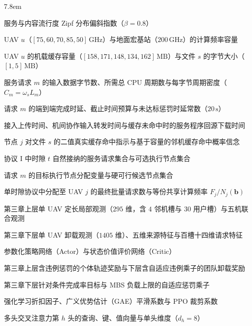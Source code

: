 \begin{notation}
\begin{notationlist}{7.8em}
    \item[$\beta$] 服务与内容流行度 Zipf 分布偏斜指数（$\beta=0.8$）
    \item[$F_u,\ F_{\mathrm{M}}$] UAV $u$（$[75,60,70,85,50]\,\mathrm{GHz}$）与地面宏基站（$200\,\mathrm{GHz}$）的计算频率容量
    \item[$S_u^{\mathrm{cache}},\ B_s$] UAV $u$ 的机载缓存容量（$[158,171,148,134,162]\,\mathrm{MB}$）与文件 $s$ 的字节大小（$[1,5]\,\mathrm{MB}$）
    \item[$L_m,\ C_m,\ \omega_s$] 服务请求 $m$ 的输入数据字节数、所需总 CPU 周期数与每字节周期密度（$C_m=\omega_s L_m$）
    \item[$T_m,\ D_m,\ T^{\mathrm{pen}}$] 请求 $m$ 的端到端完成时延、截止时间预算与未达标惩罚时延常数（$20\,\mathrm{s}$）
    \item[$U_m,\ I_{m,u,v},\ V_{j,s}$] 接入上传时间、机间协作输入转发时间与缓存未命中时的服务程序回源下载时间
    \item[$h_{j,s}(t),\ \widehat{h}_{v,s}$] 节点 $j$ 对文件 $s$ 的二值真实缓存命中指示与基于容量的邻机缓存命中概率信念
    \item[$\mathcal{M}(t),\ \mathcal{J}$] 协议 I 中时隙 $t$ 自然接纳的服务请求集合与可选执行节点集合
    \item[$b_m,\ a_m,\ \mathcal{C}_m$] 请求 $m$ 的目标执行节点分配变量与硬可行候选节点集合
    \item[$N_j(\mathbf{b}),\ f_{m,j}$] 单时隙协议中分配至 UAV $j$ 的最终批量请求数与等份共享计算频率 $F_j/N_j(\mathbf{b})$
    \item[$o_{u,t},\ \mathbf{o}_t$] 第三章上层单 UAV 定长局部观测（$295$ 维，含 $4$ 邻机槽与 $30$ 用户槽）与五机联合观测
    \item[$\mathbf{o}_u^{\mathrm{offload}},\ \mathbf{o}_u^{\mathrm{low}},\ \mathbf{r}_{u,m}$] 第三章下层单 UAV 卸载观测（$1405$ 维）、五维来源特征与百槽十四维请求特征
    \item[$\pi_\theta,\ V_\phi,\ V_\psi$] 参数化策略网络（Actor）与状态价值评价网络（Critic）
    \item[$r_u,\ r_t^{\mathrm{low}}$] 第三章上层含违例惩罚的个体轨迹奖励与下层含自适应违例乘子的团队卸载奖励
    \item[$\lambda_{\mathrm{dsr}},\ \lambda_{\mathrm{mbs}}$] 第三章下层针对条件完成率目标与 MBS 负载上限的自适应惩罚乘子
    \item[$\gamma,\ \lambda_{\mathrm{GAE}},\ \varepsilon$] 强化学习折扣因子、广义优势估计（GAE）平滑系数与 PPO 裁剪系数
    \item[$\mathbf{Q}_u^h,\ \mathbf{K}_i^h,\ \mathbf{V}_i^h,\ d_h$] 多头交叉注意力第 $h$ 头的查询、键、值向量与单头维度（$d_h=8$）

\end{notationlist}
\end{notation}
